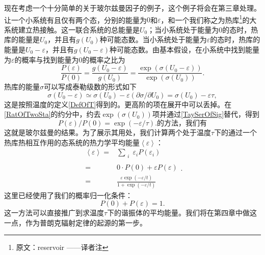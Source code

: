 现在考虑一个十分简单的关于玻尔兹曼因子的例子，这个例子将会在第三章处理。让一个小系统有且仅有两个态，分别的能量为$0$和$\varepsilon$，和一个我们称之为热库\footnote{原文：reservoir ——译者注}的大系统建立热接触。这一联合系统的总能量是$U_0$；当小系统处于能量为$0$的态时，热库的能量是$U_0$，并且有$g(U_0)$种可能态数。当小系统处于能量为$\varepsilon$的态时，热库的能量是$U_0-\varepsilon$，并且有$g(U_0-\varepsilon)$种可能态数。由基本假设，在小系统中找到能量为$\varepsilon$的概率与找到能量为$0$的概率之比为
\begin{equation}
    \frac{P\left( \varepsilon \right)}{P\left( 0 \right)}=\frac{g\left( U_0-\varepsilon \right)}{g\left( U_0 \right)}=\frac{\exp \left( \sigma \left( U_0-\varepsilon \right) \right)}{\exp \left( \sigma \left( U_0 \right) \right)}.\label{RatOfTwoSta}
\end{equation}
热库的能量$\sigma$可以写成泰勒级数的形式如下
\begin{equation}
    \sigma(U_0-\varepsilon)\simeq\sigma(U_0)-\varepsilon(\partial \sigma/\partial U_0)=\sigma(U_0)-\varepsilon\tau,\label{TaySerOfSig}
\end{equation}
这是按照温度的定义\eqref{DefOfT}得到的。更高阶的项在展开中可以丢掉。在\eqref{RatOfTwoSta}的约分中，约去$\exp(\sigma(U_0))$项并通过\eqref{TaySerOfSig}替代，得到
\begin{equation}
    P(\varepsilon)/P(0)=\exp(-\varepsilon/\tau).\label{Equ4}的方法，我们有
\end{equation}
这就是玻尔兹曼的结果。为了展示其用处，我们计算两个处于温度$\tau$下的通过一个热库热相互作用的态系统的热力学平均能量$\left< \varepsilon\right>$：
\begin{equation}
    \begin{aligned}
        \left< \varepsilon \right> =&\sum_{\begin{array}{c}
            i\\
        \end{array}}{\varepsilon _iP(\varepsilon _i)}
        \\
        =&0\cdot P\left( 0 \right) +\varepsilon P\left( \varepsilon \right) 
        \\
        =&\frac{\varepsilon \exp \left( -\varepsilon /t \right)}{1+\exp \left( -\varepsilon /t \right)}
    \end{aligned}.
\end{equation}
这里已经使用了我们的概率归一化条件：
\begin{equation}
    P(0)+P(\varepsilon)=1.
\end{equation}
这一方法可以直接推广到求温度$\tau$下的谐振体的平均能量。我们将在第四章中做这一点，作为普朗克辐射定律的起源的第一步。

